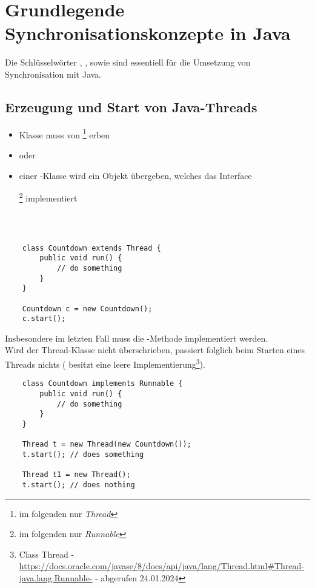 \section{Grundlegende Synchronisationskonzepte in Java}

Die Schlüsselwörter , ,  sowie  sind essentiell für die Umsetzung von Synchronisation mit Java.

\subsection{Erzeugung und Start von Java-Threads}

\begin{itemize}
    \item Klasse muss von \footnote{im folgenden nur \textit{Thread}} erben
    \item[] oder
    \item einer -Klasse wird ein Objekt übergeben, welches das Interface
    \begin{center}\end{center}\footnote{im folgenden nur \textit{Runnable}} implementiert
\end{itemize}\\

\begin{verbatim}

    class Countdown extends Thread {
        public void run() {
            // do something
        }
    }

    Countdown c = new Countdown();
    c.start();
\end{verbatim}


Insbesondere im letzten Fall muss die -Methode implementiert werden.\\

\noindent
Wird  der Thread-Klasse nicht überschrieben, passiert folglich beim Starten eines Threads nichts ( besitzt eine leere Implementierung\footnote{
    Class Thread - \url{https://docs.oracle.com/javase/8/docs/api/java/lang/Thread.html#Thread-java.lang.Runnable-} - abgerufen 24.01.2024
}).

\begin{verbatim}
    class Countdown implements Runnable {
        public void run() {
            // do something
        }
    }

    Thread t = new Thread(new Countdown());
    t.start(); // does something

    Thread t1 = new Thread();
    t.start(); // does nothing
\end{verbatim}


